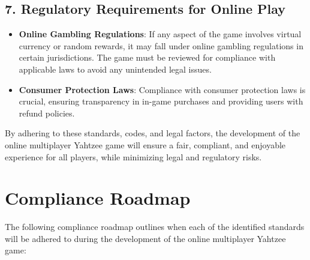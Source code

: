 \subsection*{7. Regulatory Requirements for Online Play}
\begin{itemize}
    \item \textbf{Online Gambling Regulations}: If any aspect of the game involves virtual currency or random rewards, it may fall under online gambling regulations in certain jurisdictions. The game must be reviewed for compliance with applicable laws to avoid any unintended legal issues.
    \item \textbf{Consumer Protection Laws}: Compliance with consumer protection laws is crucial, ensuring transparency in in-game purchases and providing users with refund policies.
\end{itemize}

By adhering to these standards, codes, and legal factors, the development of the online multiplayer Yahtzee game will ensure a fair, compliant, and enjoyable experience for all players, while minimizing legal and regulatory risks.

\section{Compliance Roadmap}

The following compliance roadmap outlines when each of the identified standards will be adhered to during the development of the online multiplayer Yahtzee game:

